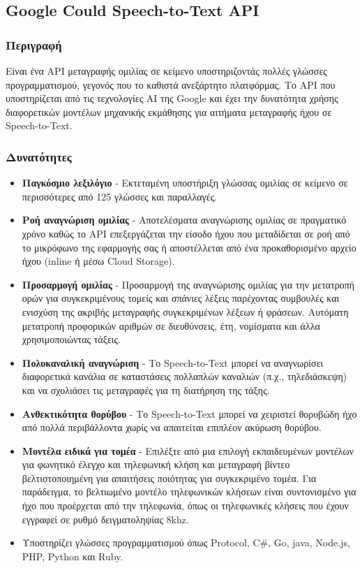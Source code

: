 \documentclass[oneside, 12pt]{book}
\begin{document}
\subsection{Google Could Speech-to-Text API}
\label{subsec:google-speech-to-text}
\subsubsection{Περιγραφή}
Είναι ένα API μεταγραφής ομιλίας σε κείμενο υποστηριζοντάς πολλές γλώσσες προγραμματισμού, γεγονός που το καθιστά ανεξάρτητο πλατφόρμας. Το API που υποστηρίζεται από τις τεχνολογίες AI της Google και έχει την δυνατότητα χρήσης διαφορετικών μοντέλων μηχανικής εκμάθησης για αιτήματα μεταγραφής ήχου σε Speech-to-Text.
\subsubsection{Δυνατότητες}
\begin{itemize}
  \item \textbf{Παγκόσμιο λεξιλόγιο} - Εκτεταμένη υποστήριξη γλώσσας ομιλίας σε κείμενο σε περισσότερες από 125 γλώσσες και παραλλαγές.
  \item \textbf{Ροή αναγνώριση ομιλίας} - Αποτελέσματα αναγνώρισης ομιλίας σε πραγματικό χρόνο καθώς το API επεξεργάζεται την είσοδο ήχου που μεταδίδεται σε ροή από το μικρόφωνο της εφαρμογής σας ή αποστέλλεται από ένα προκαθορισμένο αρχείο ήχου (inline ή μέσω Cloud Storage).
  \item \textbf{Προσαρμογή ομιλίας} - Προσαρμογή της αναγνώρισης ομιλίας για την μετατροπή ορών για συγκεκριμένους τομείς και σπάνιες λέξεις παρέχοντας συμβουλές και ενισχύση της ακριβής μεταγραφής συγκεκριμένων λέξεων ή φράσεων. Αυτόματη μετατροπή προφορικών αριθμών σε διευθύνσεις, έτη, νομίσματα και άλλα χρησιμοποιώντας τάξεις.
  \item \textbf{Πολυκαναλική αναγνώριση} - Το Speech-to-Text μπορεί να αναγνωρίσει διαφορετικά κανάλια σε καταστάσεις πολλαπλών καναλιών (π.χ., τηλεδιάσκεψη) και να σχολιάσει τις μεταγραφές για τη διατήρηση της τάξης.
  \item \textbf{Ανθεκτικότητα θορύβου} - Το Speech-to-Text μπορεί να χειριστεί θορυβώδη ήχο από πολλά περιβάλλοντα χωρίς να απαιτείται επιπλέον ακύρωση θορύβου.
  \item \textbf{Μοντέλα ειδικά για τομέα} - Επιλέξτε από μια επιλογή εκπαιδευμένων μοντέλων για φωνητικό έλεγχο και τηλεφωνική κλήση και μεταγραφή βίντεο βελτιστοποιημένη για απαιτήσεις ποιότητας για συγκεκριμένο τομέα. Για παράδειγμα, το βελτιωμένο μοντέλο τηλεφωνικών κλήσεων είναι συντονισμένο για ήχο που προέρχεται από την τηλεφωνία, όπως οι τηλεφωνικές κλήσεις που έχουν εγγραφεί σε ρυθμό δειγματοληψίας 8khz.
  \item Υποστηρίζει γλώσσες προγραμματισμού όπως Protocol, C\#, Go, java, Node.js, PHP, Python και Ruby.
\end{itemize}
\end{document}
